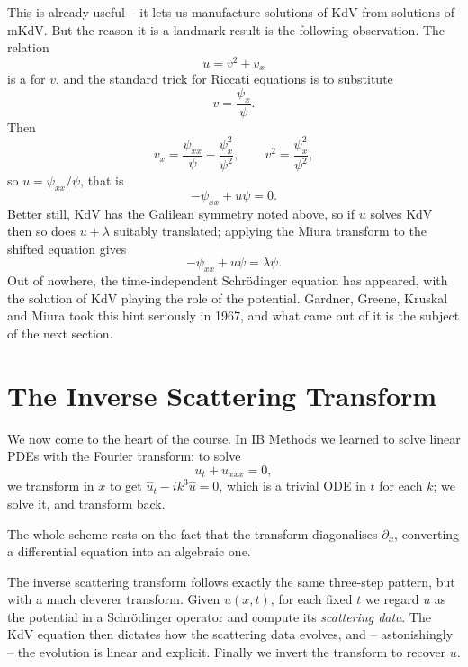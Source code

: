 \documentclass[a4paper]{scrartcl}
\begin{document}
This is already useful -- it lets us manufacture solutions of KdV from solutions of mKdV. But the reason it is a landmark result is the following observation. The relation
$$
u = v^2 + v_x
$$
is a  for $v$, and the standard trick for Riccati equations is to substitute
$$
v = \frac{\psi_x}{\psi}.
$$
Then
$$
v_x = \frac{\psi_{xx}}{\psi} - \frac{\psi_x^2}{\psi^2}, \qquad v^2 = \frac{\psi_x^2}{\psi^2},
$$
so $u = \psi_{xx}/\psi$, that is
$$
-\psi_{xx} + u\psi = 0.
$$
Better still, KdV has the Galilean symmetry noted above, so if $u$ solves KdV then so does $u + \lambda$ suitably translated; applying the Miura transform to the shifted equation gives
$$
-\psi_{xx} + u\psi = \lambda\psi.
$$
Out of nowhere, the time-independent Schr\"odinger equation has appeared, with the solution of KdV playing the role of the potential. Gardner, Greene, Kruskal and Miura took this hint seriously in 1967, and what came out of it is the subject of the next section.

\section{The Inverse Scattering Transform}

We now come to the heart of the course. In IB Methods we learned to solve linear PDEs with the Fourier transform: to solve
$$
u_t + u_{xxx} = 0,
$$
we transform in $x$ to get $\hat u_t - ik^3\hat u = 0$, which is a trivial ODE in $t$ for each $k$; we solve it, and transform back.
\begin{center}
\end{center}
The whole scheme rests on the fact that the transform diagonalises $\partial_x$, converting a differential equation into an algebraic one.

The inverse scattering transform follows exactly the same three-step pattern, but with a much cleverer transform. Given $u(x,t)$, for each fixed $t$ we regard $u$ as the potential in a Schr\"odinger operator and compute its \emph{scattering data}. The KdV equation then dictates how the scattering data evolves, and -- astonishingly -- the evolution is linear and explicit. Finally we invert the transform to recover $u$.
\end{document}
